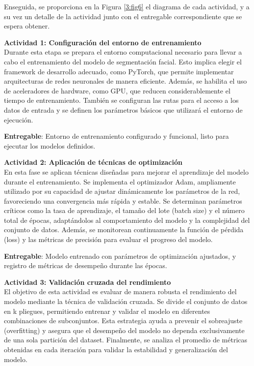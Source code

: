  Enseguida, se proporciona en la Figura \ref{3:fig6} el diagrama de cada actividad, y a su vez un detalle de la actividad junto con el entregable correspondiente que se espera obtener.
 
 \textbf{Actividad 1: Configuración del entorno de entrenamiento}
 \\
 Durante esta etapa se prepara el entorno computacional necesario para llevar a cabo el entrenamiento del modelo de segmentación facial. Esto implica elegir el framework de desarrollo adecuado, como PyTorch, que permite implementar arquitecturas de redes neuronales de manera eficiente. Además, se habilita el uso de aceleradores de hardware, como GPU, que reducen considerablemente el tiempo de entrenamiento. También se configuran las rutas para el acceso a los datos de entrada y se definen los parámetros básicos que utilizará el entorno de ejecución.

 \textbf{Entregable}: Entorno de entrenamiento configurado y funcional, listo para ejecutar los modelos definidos.

 \textbf{Actividad 2: Aplicación de técnicas de optimización}
 \\
 En esta fase se aplican técnicas diseñadas para mejorar el aprendizaje del modelo durante el entrenamiento. Se implementa el optimizador Adam, ampliamente utilizado por su capacidad de ajustar dinámicamente los parámetros de la red, favoreciendo una convergencia más rápida y estable. Se determinan parámetros críticos como la tasa de aprendizaje, el tamaño del lote (batch size) y el número total de épocas, adaptándolos al comportamiento del modelo y la complejidad del conjunto de datos. Además, se monitorean continuamente la función de pérdida (loss) y las métricas de precisión para evaluar el progreso del modelo.

 \textbf{Entregable}: Modelo entrenado con parámetros de optimización ajustados, y registro de métricas de desempeño durante las épocas.

 \textbf{Actividad 3: Validación cruzada del rendimiento}
 \\
 El objetivo de esta actividad es evaluar de manera robusta el rendimiento del modelo mediante la técnica de validación cruzada. Se divide el conjunto de datos en k pliegues, permitiendo entrenar y validar el modelo en diferentes combinaciones de subconjuntos. Esta estrategia ayuda a prevenir el sobreajuste (overfitting) y asegura que el desempeño del modelo no dependa exclusivamente de una sola partición del dataset. Finalmente, se analiza el promedio de métricas obtenidas en cada iteración para validar la estabilidad y generalización del modelo.

